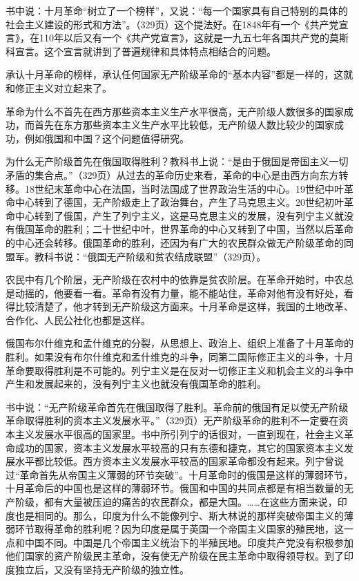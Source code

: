 书中说：十月革命“树立了一个榜样”，又说：“每一个国家具有自己特别的具体的社会主义建设的形式和方法”。（329页）这个提法好。在1848年有一个《共产党宣言》，在110年以后又有一个《共产党宣言》，这就是一九五七年各国共产党的莫斯科宣言。这个宣言就讲到了普遍规律和具体特点相结合的问题。

承认十月革命的榜样，承认任何国家无产阶级革命的“基本内容”都是一样的，这就和修正主义对立起来了。

革命为什么不首先在西方那些资本主义生产水平很高，无产阶级人数很多的国家成功，而首先在东方那些资本主义生产水平比较低，无产阶级人数比较少的国家成功，例如俄国和中国？这个问题值得研究。

为什么无产阶级首先在俄国取得胜利？教科书上说：“是由于俄国是帝国主义一切矛盾的集合点。”（329页）从过去的革命历史来看，革命的中心是由西方向东方转移。18世纪末革命中心在法国，当时法国成了世界政治生活的中心。19世纪中叶革命中心转到了德国，无产阶级走上了政治舞台，产生了马克思主义。20世纪初叶革命中心转到了俄国，产生了列宁主义，这是马克思主义的发展，没有列宁主义就没有俄国革命的胜利；二十世纪中叶，世界革命的中心又转到了中国，当然以后革命的中心还会转移。俄国革命的胜利，还因为有广大的农民群众做无产阶级革命的同盟军。教科书说：“俄国无产阶级和贫农结成联盟”（329页）。

农民中有几个阶层，无产阶级在农村中的依靠是贫农阶层。在革命开始时，中农总是动摇的，他要看一看。革命有没有力量，能不能站住，革命对他有没有好处，看得比较清楚了，他才转到无产阶级这方面来。十月革命是这样，我国的土地改革、合作化、人民公社化也都是这样。

俄国布尔什维克和孟什维克的分裂，从思想上、政治上、组织上准备了十月革命的胜利。如果没有布尔什维克和孟什维克的斗争，同第二国际修正主义的斗争，十月革命要取得胜利是不可能的。列宁主义是在反对一切修正主义和机会主义的斗争中产生和发展起来的，没有列宁主义也就没有俄国革命的胜利。

书中说：“无产阶级革命首先在俄国取得了胜利。革命前的俄国有足以使无产阶级革命取得胜利的资本主义发展水平。”（329页）无产阶级革命的胜利不一定要在资本主义发展水平很高的国家里。书中所引列宁的话很对，一直到现在，社会主义革命成功的国家，资本主义发展水平较高的只有东德和捷克，其它的国家资本主义发展水平都比较低。西方资本主义发展水平较高的国家革命都没有起来。列宁曾说过“革命首先从帝国主义薄弱的环节突破”。十月革命时的俄国是这样的薄弱环节，十月革命后的中国也是这样的薄弱环节。俄国和中国的共同点都是有相当数量的无产阶级，都有大量被压迫的痛苦的农民群众，都是大国。……在这些方面来说，印度也是相同的。那么，印度为什么不能像列宁、斯大林说的那样突破帝国主义的薄弱环节取得革命的胜利呢？因为印度是属于英国一个帝国主义国家的殖民地，这一点和中国不同。中国是几个帝国主义统治下的半殖民地。印度共产党没有积极参加他们国家的资产阶级民主革命，没有使无产阶级在民主革命中取得领导权。到了印度独立后，又没有坚持无产阶级的独立性。

